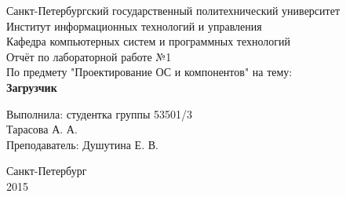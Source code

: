 \documentclass[12pt,a4paper]{article}
\begin{document}
\thispagestyle{empty}

\begin{center}
\large Санкт-Петербургский государственный политехнический университет\\
Институт информационных технологий и управления\\
Кафедра компьютерных систем и программных технологий\\
\vspace{75mm}
\Large Отчёт по лабораторной работе №1\\ По предмету "Проектирование ОС и компонентов" на тему:\\
\LARGE\textbf{Загрузчик}
\end{center}

\vspace{35mm}
\begin{flushright}
\large Выполнила: студентка группы 53501/3\\ Тарасова А. А.\\ Преподаватель: Душутина Е. В.
\end{flushright}
\vspace{40mm}

\begin{center}
Санкт-Петербург\\ 2015
\end{center}
\end{document}
